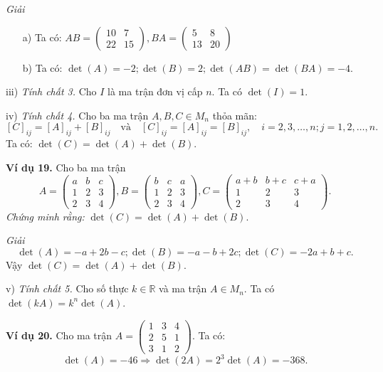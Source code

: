 \textit{Giải}
\begin{itemize}
    \item[a)] Ta có: \( AB = \begin{pmatrix}
    10 & 7 \\
    22 & 15
    \end{pmatrix}, BA = \begin{pmatrix}
    5 & 8 \\
    13 & 20
    \end{pmatrix} \)
    \item[b)] Ta có: \(\det(A) = -2; \det(B) = 2; \det(AB) = \det(BA) = -4\).
\end{itemize}

iii) \textit{Tính chất 3.} Cho \(I\) là ma trận đơn vị cấp \(n\). Ta có \(\det(I) = 1\).

iv) \textit{Tính chất 4.} Cho ba ma trận \(A, B, C \in M_n\) thỏa mãn:
\[
[C]_{ij} = [A]_{ij} + [B]_{ij} \quad \text{và} \quad [C]_{ij} = [A]_{ij} = [B]_{ij}, \quad i = 2, 3, \ldots, n; j = 1, 2, \ldots, n.
\]
Ta có: \(\det(C) = \det(A) + \det(B)\).

\textbf{Ví dụ 19.} Cho ba ma trận
\[
A = \begin{pmatrix}
a & b & c \\
1 & 2 & 3 \\
2 & 3 & 4
\end{pmatrix},
B = \begin{pmatrix}
b & c & a \\
1 & 2 & 3 \\
2 & 3 & 4
\end{pmatrix},
C = \begin{pmatrix}
a + b & b + c & c + a \\
1 & 2 & 3 \\
2 & 3 & 4
\end{pmatrix}.
\]
\textit{Chứng minh rằng:} \(\det(C) = \det(A) + \det(B)\).

\textit{Giải}
\[
\det(A) = -a + 2b - c; \det(B) = -a - b + 2c; \det(C) = -2a + b + c.
\]
Vậy \(\det(C) = \det(A) + \det(B)\).

v) \textit{Tính chất 5.} Cho số thực \(k \in \mathbb{R}\) và ma trận \(A \in M_n\). Ta có \(\det(kA) = k^n \det(A)\).

\textbf{Ví dụ 20.} Cho ma trận \(A = \begin{pmatrix}
1 & 3 & 4 \\
2 & 5 & 1 \\
3 & 1 & 2
\end{pmatrix} \).
Ta có:
\[
\det(A) = -46 \Rightarrow \det(2A) = 2^3 \det(A) = -368.
\]

